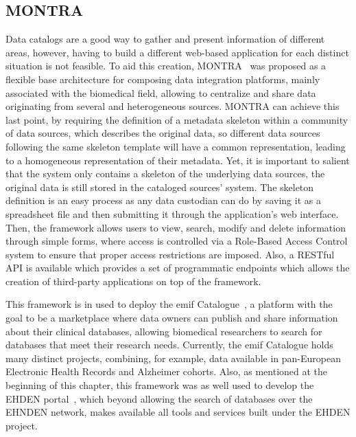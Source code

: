 \subsection*{MONTRA}
Data catalogs are a good way to gather and present information of different areas, however, having to build a different web-based application for each distinct situation is not feasible.
To aid this creation, MONTRA~\cite{montra} was proposed as a flexible base architecture for composing data integration platforms, mainly associated with the biomedical field, allowing to centralize and share data originating from several and heterogeneous sources.
MONTRA can achieve this last point, by requiring the definition of a metadata skeleton within a community of data sources, which describes the original data, so different data sources following the same skeleton template will have a common representation, leading to a homogeneous representation of their metadata.
Yet, it is important to salient that the system only contains a skeleton of the underlying data sources, the original data is still stored in the cataloged sources' system.
The skeleton definition is an easy process as any data custodian can do by saving it as a spreadsheet file and then submitting it through the application's web interface.
Then, the framework allows users to view, search, modify and delete information through simple forms, where access is controlled via a Role-Based Access Control system to ensure that proper access restrictions are imposed.
Also, a RESTful API is available which provides a set of programmatic endpoints which allows the creation of third-party applications on top of the framework.

This framework is in used to deploy the \gls{emif} Catalogue~\cite{emif}, a platform with the goal to be a marketplace where data owners can publish and share information about their clinical databases, allowing biomedical researchers to search for databases that meet their research needs.
Currently, the \gls{emif} Catalogue holds many distinct projects, combining, for example, data available in pan-European Electronic Health Records and Alzheimer cohorts.
Also, as mentioned at the beginning of this chapter, this framework was as well used to develop the EHDEN portal~\cite{ehden-portal}, which beyond allowing the search of databases over the EHNDEN network, makes available all tools and services built under the EHDEN project.

